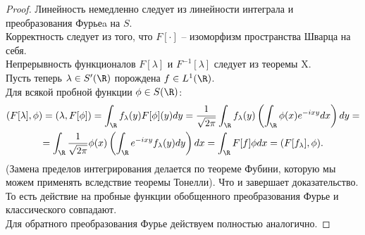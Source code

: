 \begin{proof}
    Линейность немедленно следует из линейности интеграла и преобразования Фурьеa на $S$. \\
    Корректность следует из того, что $F[\cdot]$ -- изоморфизм пространства Шварца на себя. \\
    Непрерывность функционалов $F[\lambda]$ и $F^{-1}[\lambda]$ следует из теоремы X. \\
    Пусть теперь $\lambda \in S'(\R)$ порождена $f \in L^1(\R)$. \\
    Для всякой пробной функции $\phi \in S(\R)$:
    \begin{multline*}
    (F[\lambda], \phi) = (\lambda, F[\phi]) = \int_{\R} f_{\lambda}(y) F[\phi](y) dy = \dfrac{1}{\sqrt {2\pi}} \int_{\R} f_{\lambda}(y) \left(\int_{\R} \phi(x) e^{-ixy}dx \right)dy = \\ = \int_{\R} \dfrac{1}{\sqrt {2\pi}} \phi(x) \left(\int_{\R} e^{-ixy} f_{\lambda}(y)dy \right) dx = \int_{\R} F[f]\phi dx = (F[f_{\lambda}], \phi).
    \end{multline*}
    (Замена пределов интегрирования делается по теореме Фубини, которую мы можем применять вследствие теоремы Тонелли).
    Что и завершает доказательство. То есть действие на пробные функции обобщенного преобразования Фурье и классического совпадают. \\
    Для обратного преобразования Фурье действуем полностью аналогично.
\end{proof}
